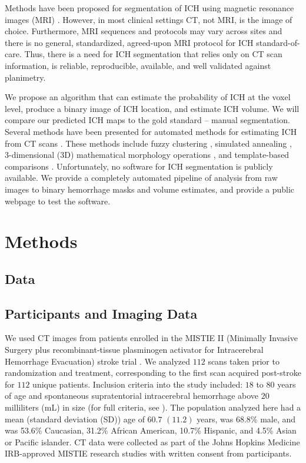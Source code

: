 \documentclass{elsarticle_nonatbib}\usepackage[]{graphicx}\usepackage[]{color}
\begin{document}
Methods have been proposed for segmentation of ICH using magnetic resonance images (MRI) \citep{wang_hematoma_2013, carhuapoma2003brain}.  However, in most clinical settings CT, not MRI, is the image of choice.  Furthermore, MRI sequences and protocols may vary across sites and there is no general, standardized, agreed-upon MRI protocol for ICH standard-of-care.
Thus, there is a need for ICH segmentation that relies only on CT scan information, is reliable, reproducible, available, and well validated against planimetry.

We propose an algorithm that can estimate the probability of ICH at the voxel level, produce a binary image of ICH location, and estimate ICH volume.  We will compare our predicted ICH maps to the gold standard -- manual segmentation.  Several methods have been presented for automated methods for estimating ICH from CT scans \citep{ gillebert_automated_2014, prakash_segmentation_2012, loncaric_hierarchical_1996, loncaric_quantitative_1999, perez_set_2007}.  These methods include fuzzy clustering \citep{prakash_segmentation_2012, loncaric_hierarchical_1996}, simulated annealing \citep{loncaric_quantitative_1999}, 3-dimensional (3D) mathematical morphology operations \citep{perez_set_2007}, and template-based comparisons \citep{gillebert_automated_2014}.  Unfortunately, no software for ICH segmentation is publicly available.
We provide a completely automated pipeline of analysis from raw images to binary hemorrhage masks and volume estimates, and provide a public webpage to test the software.

\section{Methods}

\subsection{Data}
\subsection{ Participants and Imaging Data }
We used CT images from patients enrolled in the MISTIE II (Minimally Invasive Surgery plus recombinant-tissue plasminogen activator for Intracerebral Hemorrhage Evacuation) stroke trial \citep{morgan_preliminary_2008_mistie}. We analyzed $112$ scans taken prior to randomization and treatment, corresponding to the first scan acquired post-stroke for $112$ unique patients.  Inclusion criteria into the study included: $18$ to $80$ years of age and spontaneous supratentorial intracerebral hemorrhage above $20$ milliliters (mL) in size (for full criteria, see \citet{mould_minimally_2013}).  The population analyzed here had a mean (standard deviation (SD)) age of $60.7$ $(11.2)$ years, was $68.8\%$ male, and was 53.6\% Caucasian, 31.2\% African American, 10.7\% Hispanic, and 4.5\% Asian or Pacific islander.  CT data were collected as part of the Johns Hopkins Medicine IRB-approved MISTIE research studies with written consent from participants.
\end{document}
